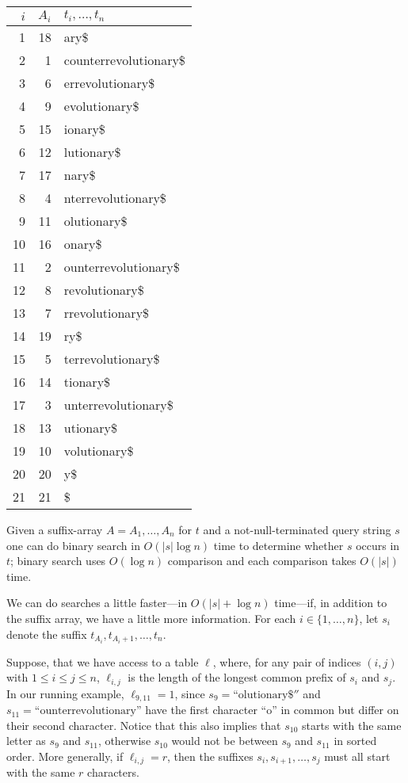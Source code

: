 \begin{center}
  \begin{tabular}{|r|r|l|}\hline
    $i$ & $A_i$ & $t_i,\ldots,t_n$ \\\hline
1&18&ary\$\\
2&1&counterrevolutionary\$\\
3&6&errevolutionary\$\\
4&9&evolutionary\$\\
5&15&ionary\$\\
6&12&lutionary\$\\
7&17&nary\$\\
8&4&nterrevolutionary\$\\
9&11&olutionary\$\\
10&16&onary\$\\
11&2&ounterrevolutionary\$\\
12&8&revolutionary\$\\
13&7&rrevolutionary\$\\
14&19&ry\$\\
15&5&terrevolutionary\$\\
16&14&tionary\$\\
17&3&unterrevolutionary\$\\
18&13&utionary\$\\
19&10&volutionary\$\\
20&20&y\$\\
21&21&\$\\\hline
\end{tabular}
\end{center}


Given a suffix-array $A=A_1,\ldots,A_n$ for $t$ and a not-null-terminated
query string $s$ one can do binary search in $O(|s|\log n)$ time to
determine whether $s$ occurs in $t$;  binary search uses $O(\log n)$
comparison and each comparison takes $O(|s|)$ time.

We can do searches a little faster---in $O(|s|+\log n)$ time---if,
in addition to the suffix array, we have a little more information.
For each $i\in\{1,\ldots,n\}$, let $s_i$ denote the suffix $t_{A_i},
t_{A_i+1},\ldots,t_{n}$.

Suppose, that we have access to a table $\ell$, where, for any
pair of indices $(i,j)$ with $1\le i\le j\le n$, $\ell_{i,j}$ is
the length of the longest common prefix of $s_i$ and $s_j$. In our
running example, $\ell_{9,11}=1$, since $s_9=\text{``olutionary\$}''$
and $s_{11}=\text{``ounterrevolutionary''}$ have the first character
``o'' in common but differ on their second character.  Notice that
this also implies that $s_{10}$ starts with the same letter as $s_9$
and $s_{11}$, otherwise $s_{10}$ would not be between $s_9$ and $s_{11}$
in sorted order.  More generally, if $\ell_{i,j}=r$, then the suffixes
$s_i,s_{i+1},\ldots,s_{j}$ must all start with the same $r$ characters.

